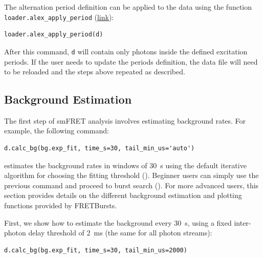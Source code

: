\documentclass[10pt,letterpaper]{article}
\begin{document}
The alternation period definition can be applied to the data
using the function \verb|loader.alex_apply_period|
(\href{http://fretbursts.readthedocs.org/en/latest/loader.html#fretbursts.loader.alex_apply_period}{link}):

\begin{lstlisting}
loader.alex_apply_period(d)
\end{lstlisting}

After this command, \verb|d| will contain only photons inside the defined excitation periods.
If the user needs to update the periods definition, the data file will need to be
reloaded and the steps above repeated as described.


\subsection*{Background Estimation}
\label{sec:bg_calc}

The first step of smFRET analysis involves estimating background rates.
For example, the following command:

\begin{lstlisting}
d.calc_bg(bg.exp_fit, time_s=30, tail_min_us='auto')
\end{lstlisting}

\noindent estimates the background rates in windows of 30~s
using the default iterative algorithm for choosing the
fitting threshold ().  %
Beginner users can simply use the previous command and 
proceed to burst search (). %
For more advanced users, this section provides details on 
the different background estimation and plotting functions 
provided by FRETBursts.

First, we show how to estimate the background every 30~s, 
using a fixed inter-photon delay threshold of 2~ms 
(the same for all photon streams):

\begin{lstlisting}
d.calc_bg(bg.exp_fit, time_s=30, tail_min_us=2000)
\end{lstlisting}
\end{document}
